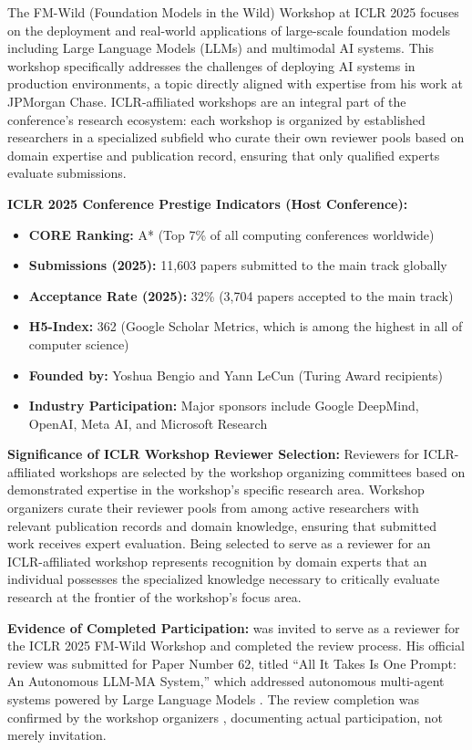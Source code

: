 The FM-Wild (Foundation Models in the Wild) Workshop at ICLR 2025 focuses on the deployment and real-world applications of large-scale foundation models including Large Language Models (LLMs) and multimodal AI systems. This workshop specifically addresses the challenges of deploying AI systems in production environments, a topic directly aligned with \drs expertise from his work at JPMorgan Chase. ICLR-affiliated workshops are an integral part of the conference's research ecosystem: each workshop is organized by established researchers in a specialized subfield who curate their own reviewer pools based on domain expertise and publication record, ensuring that only qualified experts evaluate submissions.

\textbf{ICLR 2025 Conference Prestige Indicators (Host Conference):}
\begin{itemize}
    \item \textbf{CORE Ranking:} A* (Top 7\% of all computing conferences worldwide)
    \item \textbf{Submissions (2025):} 11,603 papers submitted to the main track globally
    \item \textbf{Acceptance Rate (2025):} 32\% (3,704 papers accepted to the main track)
    \item \textbf{H5-Index:} 362 (Google Scholar Metrics, which is among the highest in all of computer science)
    \item \textbf{Founded by:} Yoshua Bengio and Yann LeCun (Turing Award recipients)
    \item \textbf{Industry Participation:} Major sponsors include Google DeepMind, OpenAI, Meta AI, and Microsoft Research
\end{itemize}

\textbf{Significance of ICLR Workshop Reviewer Selection:} Reviewers for ICLR-affiliated workshops are selected by the workshop organizing committees based on demonstrated expertise in the workshop's specific research area. Workshop organizers curate their reviewer pools from among active researchers with relevant publication records and domain knowledge, ensuring that submitted work receives expert evaluation. Being selected to serve as a reviewer for an ICLR-affiliated workshop represents recognition by domain experts that an individual possesses the specialized knowledge necessary to critically evaluate research at the frontier of the workshop's focus area.

\textbf{Evidence of Completed Participation:} \dr was invited to serve as a reviewer for the ICLR 2025 FM-Wild Workshop \cite{JR1} and completed the review process. His official review was submitted for Paper Number 62, titled ``All It Takes Is One Prompt: An Autonomous LLM-MA System,'' which addressed autonomous multi-agent systems powered by Large Language Models \cite{JR2}. The review completion was confirmed by the workshop organizers \cite{JR3}, documenting actual participation, not merely invitation.


